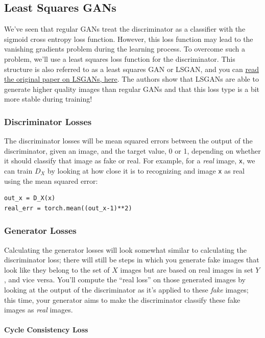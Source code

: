 \subsection{Least Squares GANs}

We've seen that regular GANs treat the discriminator as a classifier
with the sigmoid cross entropy loss function. However, this loss
function may lead to the vanishing gradients problem during the learning
process. To overcome such a problem, we'll use a least squares loss
function for the discriminator. This structure is also referred to as a
least squares GAN or LSGAN, and you can
\href{https://arxiv.org/pdf/1611.04076.pdf}{read the original paper on
LSGANs, here}. The authors show that LSGANs are able to generate higher
quality images than regular GANs and that this loss type is a bit more
stable during training!

\subsubsection{Discriminator Losses}

The discriminator losses will be mean squared errors between the output
of the discriminator, given an image, and the target value, 0 or 1,
depending on whether it should classify that image as fake or real. For
example, for a \emph{real} image, \lstinline{x}, we can
train \(D_X\) by looking at how close it is to recognizing and image
\lstinline{x} as real using the mean squared error:

\begin{lstlisting}
out_x = D_X(x)
real_err = torch.mean((out_x-1)**2)
\end{lstlisting}

\subsubsection{Generator Losses}

Calculating the generator losses will look somewhat similar to
calculating the discriminator loss; there will still be steps in which
you generate fake images that look like they belong to the set of \(X\)
images but are based on real images in set \(Y\), and vice versa. You'll
compute the ``real loss'' on those generated images by looking at the
output of the discriminator as it's applied to these \emph{fake} images;
this time, your generator aims to make the discriminator classify these
fake images as \emph{real} images.

\paragraph{Cycle Consistency Loss}

